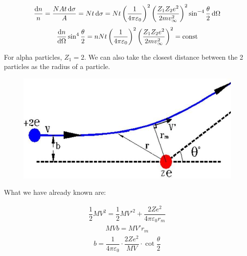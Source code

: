 \begin{equation*}
  \begin{aligned}
    \dfrac{\mathop{}\!\mathrm{d} n}{n} = \dfrac{N A t \mathop{}\!\mathrm{d} \sigma}{A} = N t \mathop{}\!\mathrm{d} \sigma = N t \left( \dfrac{1}{4 \pi \varepsilon_0}  \right)^2 \left( \dfrac{Z_1 Z_2 e^2}{2 m v_{\infty}^2}  \right)^2 \sin^{-4} \dfrac{\theta}{2} \mathop{}\!\mathrm{d} \Omega 
  \end{aligned}
\end{equation*}
\begin{equation*}
  \begin{aligned}
    \dfrac{\mathop{}\!\mathrm{d} n}{\mathop{}\!\mathrm{d} \Omega} \sin^4 \dfrac{\theta}{2} = n N t \left( \dfrac{1}{4 \pi \varepsilon_0}  \right)^2 \left( \dfrac{Z_1 Z_2 e^2}{2 m v_{\infty}^2}  \right)^2 = \mathrm{const}
  \end{aligned}
\end{equation*}

For alpha particles, $Z_1 = 2$. We can also take the closest distance between the 2 particles as the radius of a particle.

\begin{figure}[H]
  \centering
  \includegraphics[width=0.5\linewidth]{figures/Rutherford-2}
  \label{fig:}
\end{figure}

What we have already known are:

\begin{equation*}
  \begin{aligned}
    \dfrac{1}{2} M V^2 = \dfrac{1}{2} M V'^{2} + \dfrac{2 Z e^2}{4 \pi \varepsilon_0 r_m}  
  \end{aligned}
\end{equation*}
\begin{equation*}
  \begin{aligned}
    M V b = M V' r_m
  \end{aligned}
\end{equation*}
\begin{equation*}
  \begin{aligned}
    b = \dfrac{1}{4 \pi \varepsilon_0} \cdot \dfrac{2 Z e^2}{M V} \cdot \cot \dfrac{\theta}{2} 
  \end{aligned}
\end{equation*}


